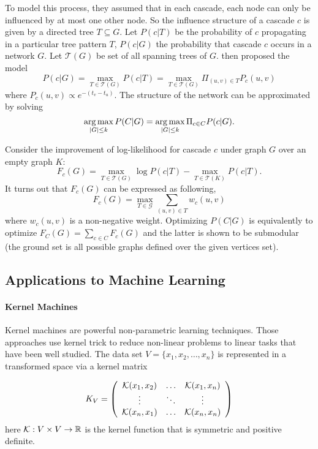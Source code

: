To model this process, they assumed that in each cascade, each node can only be influenced by at most one other node. So the influence structure of a cascade $c$ is given by a directed tree $T \subseteq G$. Let $P(c|T)$ be the probability of $c$ propagating in a particular tree pattern $T$, $P(c|G)$ the probability that cascade $c$ occurs in a network $G$. Let $\mathcal{T}(G)$ be set of all spanning trees of $G$. \cite{GLK10} then proposed the model 
$$P(c|G) = \max_{T\in\mathcal{T}(G)}P(c|T) = \max_{T\in\mathcal{T}(G)}\Pi_{(u,v)\in T}P_c(u,v)$$
where $P_c(u, v) \propto e^{-(t_v - t_u)}$. The structure of the network can be approximated by solving 
 $$\operatorname*{arg\,max}_{|G|\leq k} P(C|G) = \operatorname*{arg\,max}_{|G|\leq k}\Pi_{c\in C}P(c|G).$$


Consider the improvement of log-likelihood for cascade $c$ under graph $G$ over an empty graph $K$:
$$F_c(G) = \max_{T\in \mathcal{T}(G)}\log P(c|T) - \max_{T\in \mathcal{T}(K)}P(c|T).$$
It turns out that $F_c(G)$ can be expressed as following,
$$F_c(G) = \max_{T\in\mathcal{G}}\sum_{(u, v)\in T}w_c(u, v)$$
where $w_c(u, v)$ is a non-negative weight. Optimizing $P(C|G)$ is equivalently to optimize $F_C(G) = \sum_{c\in C}F_c(G)$ and the latter is shown to be submodular (the ground set is all possible graphs defined over the given vertices set). 






\subsection{Applications to Machine Learning}
\paragraph{Kernel Machines}
Kernel machines \cite{SS02} are powerful non-parametric learning techniques. Those approaches use kernel trick to reduce non-linear problems to linear tasks that have been well studied. The data set $V = \{x_1, x_2, \ldots, x_n\}$ is represented in a transformed space via a kernel matrix

\[ K_V = \left( \begin{array}{ccc}
\mathcal{K}(x_1, x_2) & \ldots & \mathcal{K}(x_1, x_n) \\
\vdots & \ddots & \vdots \\
\mathcal{K}(x_n,x_1) & \ldots & \mathcal{K}(x_n, x_n) \end{array} \right)\] 
here $\mathcal{K}: V\times V \rightarrow \mathbb{R}$ is the kernel function that is symmetric and positive definite. 

